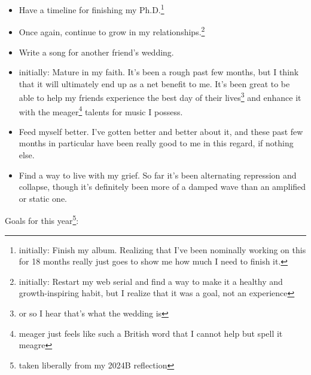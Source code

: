 \documentclass[12pt]{article}[titlepage]
\renewcommand{\,}{\textsuperscript{,}}
\begin{document}
\begin{itemize}  
\item Have a timeline for finishing my Ph.D.\footnote{initially: Finish my album. Realizing that I've been nominally working on this for 18 months really just goes to show me how much I need to finish it.}  
\item Once again, continue to grow in my relationships.\footnote{initially: Restart my web serial and find a way to make it a healthy and growth-inspiring habit, but I realize that it was a goal, not an experience}  
\item Write a song for another friend's wedding.\item{initially: Mature in my faith. It's been a rough past few months, but I think that it will ultimately end up as a net benefit to me.} It's been great to be able to help my friends experience the best day of their lives\footnote{or so I hear that's what the wedding is} and enhance it with the meager\footnote{meager just feels like such a British word that I cannot help but spell it meagre} talents for music I possess.  
\item Feed myself better. I've gotten better and better about it, and these past few months in particular have been really good to me in this regard, if nothing else.  
\item Find a way to live with my grief. So far it's been alternating repression and collapse, though it's definitely been more of a damped wave than an amplified or static one.  
\end{itemize}  


Goals for this year\footnote{taken liberally from my 2024B reflection}:
\end{document}
